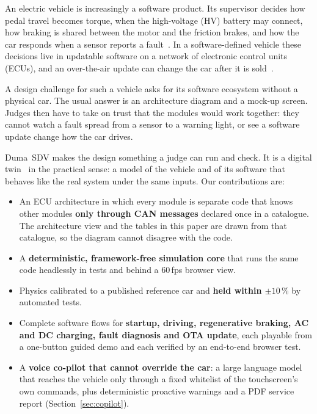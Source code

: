 \documentclass[10pt]{article}
\newcommand{\sdv}{Duma~SDV}
\begin{document}
An electric vehicle is increasingly a software product. Its supervisor decides how pedal travel becomes torque, when the high-voltage (HV) battery may connect, how braking is shared between the motor and the friction brakes, and how the car responds when a sensor reports a fault~\cite{ehsani2018}. In a software-defined vehicle these decisions live in updatable software on a network of electronic control units (ECUs), and an over-the-air update can change the car after it is sold~\cite{unece_r156}.

A design challenge for such a vehicle asks for its software ecosystem without a physical car. The usual answer is an architecture diagram and a mock-up screen. Judges then have to take on trust that the modules would work together: they cannot watch a fault spread from a sensor to a warning light, or see a software update change how the car drives.

\sdv{} makes the design something a judge can run and check. It is a digital twin~\cite{grieves2017} in the practical sense: a model of the vehicle and of its software that behaves like the real system under the same inputs. Our contributions are:
\begin{itemize}
  \item An ECU architecture in which every module is separate code that knows other modules \textbf{only through CAN messages} declared once in a catalogue. The architecture view and the tables in this paper are drawn from that catalogue, so the diagram cannot disagree with the code.
  \item A \textbf{deterministic, framework-free simulation core} that runs the same code headlessly in tests and behind a 60\,fps browser view.
  \item Physics calibrated to a published reference car and \textbf{held within $\pm 10\,\%$} by automated tests.
  \item Complete software flows for \textbf{startup, driving, regenerative braking, AC and DC charging, fault diagnosis and OTA update}, each playable from a one-button guided demo and each verified by an end-to-end browser test.
  \item A \textbf{voice co-pilot that cannot override the car}: a large language model that reaches the vehicle only through a fixed whitelist of the touchscreen's own commands, plus deterministic proactive warnings and a PDF service report (Section~\ref{sec:copilot}).
\end{itemize}
\end{document}
